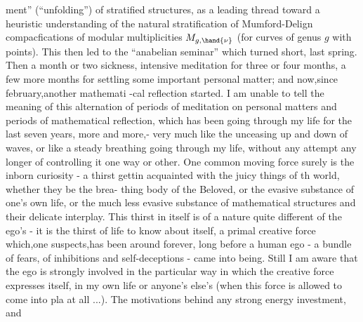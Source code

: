 
ment'' (``unfolding'') of stratified structures,  as a leading thread toward
a heuristic understanding of the natural stratification of  Mumford-Delign
compacfications of modular multiplicities $M_{g,\hand{\nu}}$ (for curves of genus $g$
 with \hand{$\nu$} points).  This then led to the ``anabelian seminar'' which
 turned short,  last spring.  Then a month or two sickness,  intensive
meditation  for three or four months,  a few more months for settling
some important personal matter;  and now,since february,another mathemati%
-cal reflection started. \hand{$\rfloor$}I  am unable to tell the meaning of this
alternation of periods of meditation on personal matters and periods of
mathematical reflection,  which has been going through my life for the
last seven years,  more and more,- very much like the unceasing
up and down of waves,  or like a steady breathing going through my life,
without any attempt any longer of controlling it one way or other.  One
common moving force surely is the inborn curiosity  -  a thirst  gettin
acquainted with the juicy things of th  world,  whether they be the brea-%
thing body of the Beloved,  or the evasive substance of one's own life,
or the much less evasive substance of mathematical structures and their
delicate interplay.  This thirst in itself is of a nature quite different
of the ego's  -  it is the thirst of life to know about itself,  a primal
creative force which,one suspects,has been around forever,  long before
a human ego  -  a bundle  of fears,  of inhibitions and self-deceptions -
came into being.  Still I am aware that the ego is strongly involved in
the particular way in which the creative force expresses itself,  in my
own life or anyone's else's (when this force is allowed to come into pla
at all ...).  The motivations behind any strong energy investment,  and
